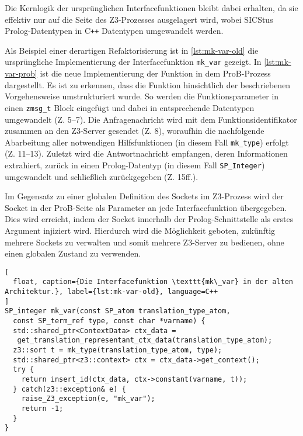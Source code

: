 Die Kernlogik der ursprünglichen Interfacefunktionen bleibt dabei erhalten, da sie effektiv nur auf die Seite des Z3-Prozesses ausgelagert wird,
wobei SICStus Prolog-Datentypen in C\texttt{++} Datentypen umgewandelt werden.

Als Beispiel einer derartigen Refaktorisierung ist in \cref{lst:mk-var-old} die ursprüngliche Implementierung der Interfacefunktion \texttt{mk\_var} gezeigt.
In \cref{lst:mk-var-prob} ist die neue Implementierung der Funktion in dem ProB-Prozess dargestellt.
Es ist zu erkennen, dass die Funktion hinsichtlich der beschriebenen Vorgehensweise umstrukturiert wurde.
So werden die Funktionsparameter in einen \texttt{zmsg\_t} Block eingefügt und dabei in entsprechende Datentypen umgewandelt (Z. 5--7).
Die Anfragenachricht wird mit dem Funktionsidentifikator zusammen an den Z3-Server gesendet (Z. 8), woraufhin
die nachfolgende Abarbeitung aller notwendigen Hilfsfunktionen (in diesem Fall \texttt{mk\_type}) erfolgt (Z. 11--13).
Zuletzt wird die Antwortnachricht empfangen, deren Informationen extrahiert, zurück in einen Prolog-Datentyp (in diesem Fall \texttt{SP\_Integer}) umgewandelt und schließlich zurückgegeben (Z. 15ff.).

Im Gegensatz zu einer globalen Definition des Sockets im Z3-Prozess wird der Socket in der ProB-Seite als Parameter an jede Interfacefunktion übergegeben.
Dies wird erreicht, indem der Socket innerhalb der Prolog-Schnittstelle als erstes Argument injiziert wird.
Hierdurch wird die Möglichkeit geboten, zukünftig mehrere Sockets zu verwalten und somit mehrere Z3-Server zu bedienen, ohne einen globalen Zustand zu verwenden.

\begin{lstlisting}[
  float, caption={Die Interfacefunktion \texttt{mk\_var} in der alten Architektur.}, label={lst:mk-var-old}, language=C++
]
SP_integer mk_var(const SP_atom translation_type_atom,
  const SP_term_ref type, const char *varname) {
  std::shared_ptr<ContextData> ctx_data =
   get_translation_representant_ctx_data(translation_type_atom);
  z3::sort t = mk_type(translation_type_atom, type);
  std::shared_ptr<z3::context> ctx = ctx_data->get_context();
  try {
    return insert_id(ctx_data, ctx->constant(varname, t));
  } catch(z3::exception& e) {
    raise_Z3_exception(e, "mk_var");
    return -1;
  }
}
\end{lstlisting}

